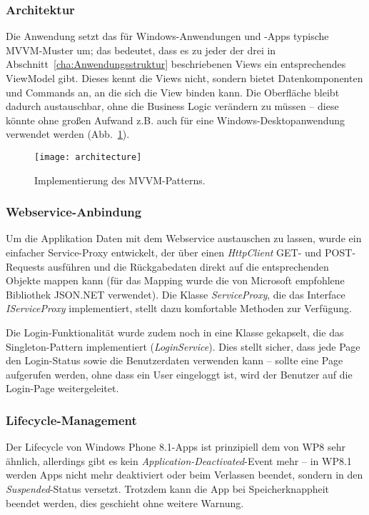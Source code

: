 \documentclass[a4paper,ngerman]{scrartcl}
\begin{document}
\subsubsection{Architektur}
Die Anwendung setzt das für Windows-Anwendungen und -Apps typische MVVM-Muster um; das bedeutet, dass es zu jeder der drei in Abschnitt~\ref{cha:Anwendungsstruktur} beschriebenen Views ein entsprechendes ViewModel gibt. Dieses kennt die Views nicht, sondern bietet Datenkomponenten und Commands an, an die sich die View binden kann. Die Oberfläche bleibt dadurch austauschbar, ohne die Business Logic verändern zu müssen -- diese könnte ohne großen Aufwand z.B. auch für eine Windows-Desktopanwendung verwendet werden (Abb.~\ref{fig:arch}). 

\begin{figure}[h]
\centering
\texttt{[image: architecture]}
\caption{Implementierung des MVVM-Patterns.}
\label{fig:arch}
\end{figure}

\subsubsection{Webservice-Anbindung}
Um die Applikation Daten mit dem Webservice austauschen zu lassen, wurde ein einfacher Service-Proxy entwickelt, der über einen \textit{HttpClient} GET- und POST-Requests ausführen und die Rückgabedaten direkt auf die entsprechenden Objekte mappen kann (für das Mapping wurde die von Microsoft empfohlene Bibliothek JSON.NET verwendet). Die Klasse \textit{ServiceProxy}, die das Interface \textit{IServiceProxy} implementiert, stellt dazu komfortable Methoden zur Verfügung. 

Die Login-Funktionalität wurde zudem noch in eine Klasse gekapselt, die das Singleton-Pattern implementiert (\textit{LoginService}). Dies stellt sicher, dass jede Page den Login-Status sowie die Benutzerdaten verwenden kann -- sollte eine Page aufgerufen werden, ohne dass ein User eingeloggt ist, wird der Benutzer auf die Login-Page weitergeleitet.

\subsubsection{Lifecycle-Management}
Der Lifecycle von Windows Phone 8.1-Apps ist prinzipiell dem von WP8 sehr ähnlich, allerdings gibt es kein \textit{Application-Deactivated}-Event mehr -- in WP8.1 werden Apps nicht mehr deaktiviert oder beim Verlassen beendet, sondern in den \textit{Suspended}-Status versetzt. Trotzdem kann die App bei Speicherknappheit beendet werden, dies geschieht ohne weitere Warnung.
\end{document}

